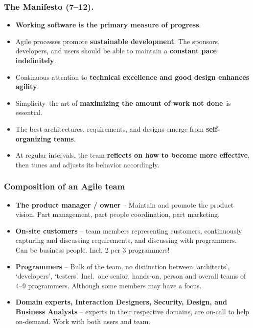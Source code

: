 \documentclass{beamer} %
\newcommand\emc[1]{\textcolor{brightblue}{\textbf{#1}}}
\begin{document}
\begin{frame}
\frametitle{The Manifesto (7--12).}

\begin{itemize}


\item \emc{Working software is the primary measure of progress}.

\item Agile processes promote \emc{sustainable development}. 
The sponsors, developers, and users should be able 
to maintain a \emc{constant pace indefinitely}.

\item Continuous attention to \emc{technical excellence 
and good design enhances agility}.

\item Simplicity--the art of \emc{maximizing the amount 
of work not done}--is essential.

\item The best architectures, requirements, and designs 
emerge from \emc{self-organizing teams}.

\item At regular intervals, the team \emc{reflects on how 
to become more effective}, then tunes and adjusts 
its behavior accordingly.

\end{itemize}

\end{frame}


\begin{frame}

\frametitle{Composition of an Agile team}

\begin{itemize}
\item \emc{The product manager / owner} -- Maintain and promote the product vision. Part management, part people coordination, part marketing.

\item \emc{On-site customers} -- team members representing customers, continuously capturing and discussing requirements, and discussing with programmers. \\ Can be business people. Incl. 2 per 3 programmers!

\item \emc{Programmers} -- Bulk of the team, no distinction between `architects', `developers', `testers'. Incl.\ one senior, hands-on, person and overall teams of 4--9 programmers. Although some members may have a focus.

\item \emc{Domain experts, Interaction Designers, Security, Design, and Business Analysts} -- experts in their respective domains, are on-call to help on-demand. Work with both users and team.

\end{itemize}

\end{frame}
\end{document}
